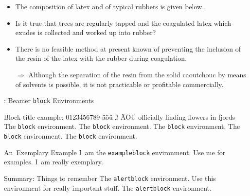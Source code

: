\begin{frame}{\titleprefix}

	\begin{itemize}
		\item The composition of latex and of typical rubbers is given below.
		\item Is it true that trees are regularly tapped and the coagulated latex which exudes is collected and worked up into rubber?
	\end{itemize}
	
	\pause

	\begin{itemize}
		\item There is no feasible method at present known of preventing the inclusion of the resin of the latex with the rubber during coagulation.
		\item[$\Rightarrow$\hspace{-2.5pt}] Although the separation of the resin from the solid caoutchouc by means of solvents is possible, it is not practicable or profitable commercially.
	\end{itemize}

\end{frame}


\begin{frame}{\titleprefix: Beamer \texttt{block} Environments}

	\begin{block}{Block title example: 0123456789 äöü ß ÄÖÜ officially finding flowers in fjords}
		The \texttt{block} environment. The \texttt{block} environment. The \texttt{block} environment. The \texttt{block} environment. The \texttt{block} environment. \insertblocktitle
	\end{block}%
	
	\begin{exampleblock}{An~Exemplary Example}
		I~am the \texttt{exampleblock} environment. Use me for examples. I~am really exemplary.
	\end{exampleblock}
	
	\begin{alertblock}{Summary: Things to remember}
		The \texttt{alertblock} environment. Use this environment for really important stuff. The \texttt{alertblock} environment.
	\end{alertblock}

\end{frame}


